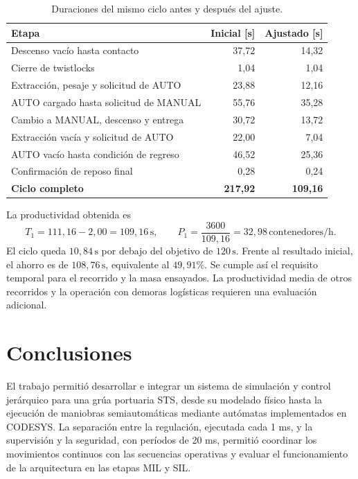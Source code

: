 \documentclass[a4paper,10pt,onecolumn,journal]{ieeeconf}
\numberwithin{equation}{section}
\newcommand{\un}[1]{\,\mathrm{#1}}
\begin{document}
\begin{table}[H]\centering\small
\caption{Duraciones del mismo ciclo antes y después del ajuste.}
\label{tab:productividad_ajustada}
\begin{tabularx}{\linewidth}{@{}Yrr@{}}\toprule
Etapa & Inicial [s] & Ajustado [s]\\\midrule
Descenso vacío hasta contacto & 37,72 & 14,32\\
Cierre de twistlocks & 1,04 & 1,04\\
Extracción, pesaje y solicitud de AUTO & 23,88 & 12,16\\
AUTO cargado hasta solicitud de MANUAL & 55,76 & 35,28\\
Cambio a MANUAL, descenso y entrega & 30,72 & 13,72\\
Extracción vacía y solicitud de AUTO & 22,00 & 7,04\\
AUTO vacío hasta condición de regreso & 46,52 & 25,36\\
Confirmación de reposo final & 0,28 & 0,24\\\midrule
\textbf{Ciclo completo} & \textbf{217,92} & \textbf{109,16}\\\bottomrule
\end{tabularx}
\end{table}

La productividad obtenida es
\begin{equation}
T_1=111{,}16-2{,}00=109{,}16\un{s},\qquad
P_1=\frac{3600}{109{,}16}=32{,}98\un{contenedores/h}.
\end{equation}
El ciclo queda $10{,}84\un{s}$ por debajo del objetivo de
$120\un{s}$. Frente al resultado inicial, el ahorro es de
$108{,}76\un{s}$, equivalente al $49{,}91\%$. Se cumple así
el requisito temporal para el recorrido y la masa ensayados.
La productividad media de otros recorridos y la operación con demoras
logísticas requieren una evaluación adicional.

\par
{}
\section{Conclusiones}

El trabajo permitió desarrollar e integrar un sistema de simulación y control jerárquico para una grúa portuaria STS, desde su modelado físico hasta la ejecución de maniobras semiautomáticas mediante autómatas implementados en CODESYS. La separación entre la regulación, ejecutada cada 1 ms, y la supervisión y la seguridad, con períodos de 20 ms, permitió coordinar los movimientos continuos con las secuencias operativas y evaluar el funcionamiento de la arquitectura en las etapas MIL y SIL.
\end{document}
